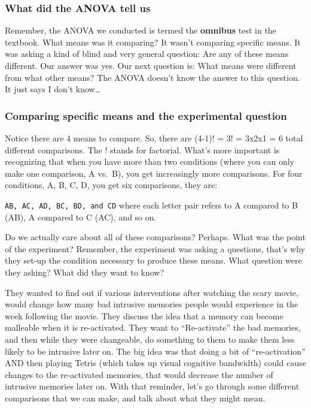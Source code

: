 \documentclass[
]{book}
\begin{document}
\hypertarget{what-did-the-anova-tell-us}{%
\subsubsection{What did the ANOVA tell us}\label{what-did-the-anova-tell-us}}

Remember, the ANOVA we conducted is termed the \textbf{omnibus} test in the textbook. What means was it comparing? It wasn't comparing specific means. It was asking a kind of blind and very general question: Are any of these means different. Our answer was yes. Our next question is: What means were different from what other means? The ANOVA doesn't know the answer to this question. It just says I don't know\ldots{}

\hypertarget{comparing-specific-means-and-the-experimental-question}{%
\subsubsection{Comparing specific means and the experimental question}\label{comparing-specific-means-and-the-experimental-question}}

Notice there are 4 means to compare. So, there are (4-1)! = 3! = 3x2x1 = 6 total different comparisons. The ! stands for factorial. What's more important is recognizing that when you have more than two conditions (where you can only make one comparison, A vs.~B), you get increasingly more comparisons. For four conditions, A, B, C, D, you get six comparisons, they are:

\texttt{AB,\ AC,\ AD,\ BC,\ BD,\ and\ CD} where each letter pair refers to A compared to B (AB), A compared to C (AC), and so on.

Do we actually care about all of these comparisons? Perhaps. What was the point of the experiment? Remember, the experiment was asking a questions, that's why they set-up the condition necessary to produce these means. What question were they asking? What did they want to know?

They wanted to find out if various interventions after watching the scary movie, would change how many bad intrusive memories people would experience in the week following the movie. They discuss the idea that a memory can become malleable when it is re-activated. They want to ``Re-activate'' the bad memories, and then while they were changeable, do something to them to make them less likely to be intrusive later on. The big idea was that doing a bit of ``re-activation'' AND then playing Tetris (which takes up visual cognitive bandwidth) could cause changes to the re-activated memories, that would decrease the number of intrusive memories later on. With that reminder, let's go through some different comparisons that we can make, and talk about what they might mean.
\end{document}
